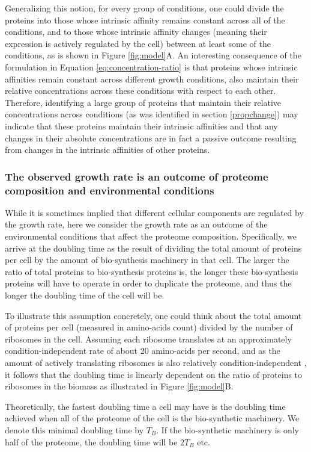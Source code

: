\documentclass[notitlepage]{article}
\begin{document}
Generalizing this notion, for every group of conditions, one could divide the proteins into those whose intrinsic affinity remains constant across all of the conditions, and to those whose intrinsic affinity changes (meaning their expression is actively regulated by the cell) between at least some of the conditions, as is shown in Figure \ref{fig:model}A.
An interesting consequence of the formulation in Equation \ref{eq:concentration-ratio} is that proteins whose intrinsic affinities remain constant across different growth conditions, also maintain their relative concentrations across these conditions with respect to each other.
Therefore, identifying a large group of proteins that maintain their relative concentrations across conditions (as was identified in section \ref{propchange}) may indicate that these proteins maintain their intrinsic affinities and that any changes in their absolute concentrations are in fact a passive outcome resulting from changes in the intrinsic affinities of other proteins.

\subsubsection{The observed growth rate is an outcome of proteome composition and environmental conditions}
While it is sometimes implied that different cellular components are regulated by the growth rate, here we consider the growth rate as an outcome of the environmental conditions that affect the proteome composition.
Specifically, we arrive at the doubling time as the result of dividing the total amount of proteins per cell by the amount of bio-synthesis machinery in that cell.
The larger the ratio of total proteins to bio-synthesis proteins is, the longer these bio-synthesis proteins will have to operate in order to duplicate the proteome, and thus the longer the doubling time of the cell will be.

To illustrate this assumption concretely, one could think about the total amount of proteins per cell (measured in amino-acids count) divided by the number of ribosomes in the cell.
Assuming each ribosome translates at an approximately condition-independent rate of about 20 amino-acids per second, and as the amount of actively translating ribosomes is also relatively condition-independent \cite{Phillips2009}, it follows that the doubling time is linearly dependent on the ratio of proteins to ribosomes in the biomass as illustrated in Figure \ref{fig:model}B.

Theoretically, the fastest doubling time a cell may have is the doubling time achieved when all of the proteome of the cell is the bio-synthetic machinery.
We denote this minimal doubling time by $T_B$.
If the bio-synthetic machinery is only half of the proteome, the doubling time will be $2T_B$ etc.
\end{document}
